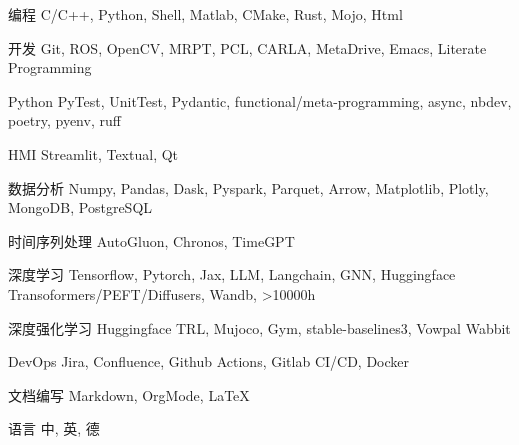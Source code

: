 \documentclass[../cv_cn.tex]{subfiles}
\begin{document}


\begin{cvskills}

  \cvskill
    {编程} %
    {C/C++, Python, Shell, Matlab, CMake, Rust, Mojo, Html} %

  \cvskill
    {开发} %
    {Git, ROS, OpenCV, MRPT, PCL, CARLA, MetaDrive, Emacs, Literate Programming} %

  \cvskill
    {Python} %
    {PyTest, UnitTest, Pydantic, functional/meta-programming, async, nbdev, poetry, pyenv, ruff} %

  \cvskill
    {HMI} %
    {Streamlit, Textual, Qt} %

  \cvskill
    {数据分析} %
    {Numpy, Pandas, Dask, Pyspark, Parquet, Arrow, Matplotlib, Plotly, MongoDB, PostgreSQL} %

  \cvskill
    {时间序列处理} %
    {AutoGluon, Chronos, TimeGPT} %

  \cvskill
    {深度学习} %
    {Tensorflow, Pytorch, Jax, LLM, Langchain, GNN, Huggingface Transoformers/PEFT/Diffusers, Wandb, >10000h} %

  \cvskill
    {深度强化学习} %
    {Huggingface TRL, Mujoco, Gym, stable-baselines3, Vowpal Wabbit} %


  \cvskill
    {DevOps} %
    {Jira, Confluence, Github Actions, Gitlab CI/CD, Docker} %

  \cvskill
    {文档编写} %
    {Markdown, OrgMode, LaTeX} %

  \cvskill
    {语言} %
    {中, 英, 德} %

\end{cvskills}
\end{document}
